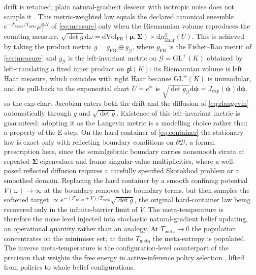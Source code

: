 \documentclass[11pt]{article}
\theoremstyle{plain}
\theoremstyle{definition}
\newcommand{\GL}{\mathrm{GL}}
\newcommand{\Lie}{\mathfrak{gl}}
\newcommand{\dd}{\mathrm{d}}
\newcommand{\bmu}{\boldsymbol{\mu}}
\newcommand{\bSigma}{\boldsymbol{\Sigma}}
\newcommand{\bphi}{\boldsymbol{\phi}}
\newcommand{\Fcal}{\mathcal{F}}
\newcommand{\Dcal}{\mathcal{D}}
\newcommand{\Gcal}{\mathcal{G}}
\newcommand{\Tmeta}{T_{\mathrm{meta}}}
\begin{document}
drift is retained; plain natural-gradient descent with isotropic noise does not sample it
\citep{girolami2011riemann,welling2011bayesian,xifara2014langevin}. This metric-weighted law equals
the declared canonical ensemble $e^{-\Fcal_{\mathrm{belief}}/\Tmeta}\mu_1^{\otimes N}$ of
\cref{eq:measure} only when the Riemannian volume reproduces the counting measure,
$\sqrt{\det g}\dd\omega=\dd\mathrm{Vol}_{\mathrm{FR}}(\bmu,\bSigma)\times\dd\mu_{\mathrm{Haar}}^{\Gcal}(U)$.
This is achieved by taking the product metric $g=g_{\mathrm{FR}}\oplus g_{\Gcal}$, where $g_{\mathrm{FR}}$
is the Fisher--Rao metric of \cref{sec:measure} and $g_{\Gcal}$ is the left-invariant metric on
$\Gcal=\GL^{+}(K)$ obtained by left-translating a fixed inner product on $\Lie(K)$: its Riemannian
volume is left Haar measure, which coincides with right Haar because $\GL^{+}(K)$ is unimodular, and
its pull-back to the exponential chart $U=e^{\bphi}$ is $\sqrt{\det g_{\Gcal}}\dd\bphi=J_{\exp}(\bphi)\dd\bphi$,
so the exp-chart Jacobian enters both the drift and the diffusion of \cref{eq:rlangevin} automatically
through $g$ and $\sqrt{\det g}$. Existence of this left-invariant metric is guaranteed; adopting it as
the Langevin metric is a modelling choice rather than a property of the E-step. On the hard container
of \cref{eq:container} the stationary law is exact only with reflecting boundary conditions on
$\partial\Dcal$, a formal prescription here, since the semialgebraic boundary carries nonsmooth strata
at repeated $\bSigma$ eigenvalues and frame singular-value multiplicities, where a well-posed reflected
diffusion requires a carefully specified Skorokhod problem or a smoothed domain. Replacing the hard
container by a smooth confining potential $V(\omega)\to\infty$ at the boundary removes the boundary
terms, but then samples the softened target $\propto e^{-(\Fcal_{\mathrm{belief}}+V)/\Tmeta}\sqrt{\det g}$,
the original hard-container law being recovered only in the infinite-barrier limit of $V$. The meta-temperature is therefore the
noise level injected into stochastic natural-gradient belief updating, an operational
quantity rather than an analogy. At $\Tmeta\to0$ the population concentrates on the
minimiser set; at finite $\Tmeta$ the meta-entropy is populated. The inverse
meta-temperature is the configuration-level counterpart of the precision that weights the
free energy in active-inference policy selection \citep{friston2017active}, lifted from
policies to whole belief configurations.
\end{document}
